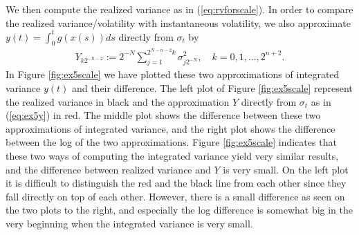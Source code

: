 \documentclass{article}
\begin{document}
We then compute the realized variance as in (\ref{eq:rvforscale}). In order to compare the realized variance/volatility with instantaneous volatility, we also approximate $y(t) = \int_0^t g\left(x(s)\right) ds$ directly from $\sigma_t$ by 
\begin{align}
Y_{k2^{-n-2}}:= 2^{-N} \sum_{j=1}^{2^{N-n-2}k} \sigma^2_{j2^{-N}}, \quad k=0,1,...,2^{n+2}. \label{eq:ex5y}
\end{align}
In Figure \ref{fig:ex5scale} we have plotted these two approximations of integrated variance $y(t)$ and their difference. The left plot of Figure \ref{fig:ex5scale} represent the realized variance in black and the approximation $Y$ directly from $\sigma_t$ as in (\ref{eq:ex5y}) in red. The middle plot shows the difference between these two approximations of integrated variance, and the right plot shows the difference between the log of the two approximations. Figure \ref{fig:ex5scale} indicates that these two ways of computing the integrated variance yield very similar results, and the difference between realized variance and $Y$ is very small. On the left plot it is difficult to distinguish the red and the black line from each other since they fall directly on top of each other. However, there is a small difference as seen on the two plots to the right, and especially the log difference is somewhat big in the very beginning when the integrated variance is very small.
\end{document}
